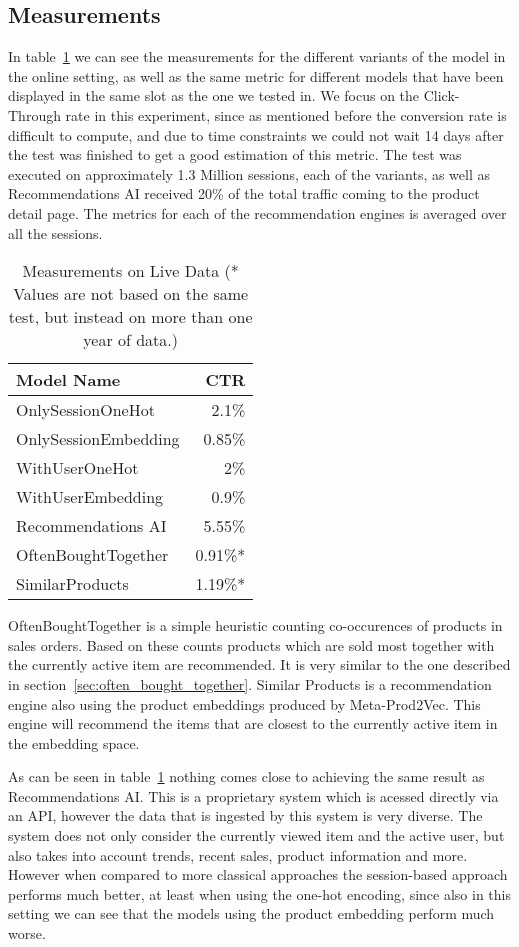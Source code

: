 \subsection{Measurements}
In table~\ref{tab:online_measurements} we can see the measurements for the different variants of the model in the online setting, as well as the same metric for different models that have been displayed in the same slot as the one we tested in.
We focus on the Click-Through rate in this experiment, since as mentioned before the conversion rate is difficult to compute, and due to time constraints we could not wait 14 days after the test was finished to get a good estimation of this metric.
The test was executed on approximately 1.3 Million sessions, each of the variants, as well as Recommendations AI received 20\% of the total traffic coming to the product detail page.
The metrics for each of the recommendation engines is averaged over all the sessions.
\begin{table}[t]
    \centering
    \begin{tabular}{lr}\toprule
        \textbf{Model Name} & \textbf{CTR} \\ \midrule
        OnlySessionOneHot & 2.1\% \\
        OnlySessionEmbedding & 0.85\% \\
        WithUserOneHot & 2\% \\
        WithUserEmbedding & 0.9\% \\
        Recommendations AI & 5.55\% \\
        OftenBoughtTogether & 0.91\%* \\
        SimilarProducts & 1.19\%* \\ \bottomrule
    \end{tabular}
    \caption{Measurements on Live Data (* Values are not based on the same test, but instead on more than one year of data.)}
    \label{tab:online_measurements}
\end{table}
\par
OftenBoughtTogether is a simple heuristic counting co-occurences of products in sales orders.
Based on these counts products which are sold most together with the currently active item are recommended.
It is very similar to the one described in section~\ref{sec:often_bought_together}.
Similar Products is a recommendation engine also using the product embeddings produced by Meta-Prod2Vec.
This engine will recommend the items that are closest to the currently active item in the embedding space.
\par
As can be seen in table~\ref{tab:online_measurements} nothing comes close to achieving the same result as Recommendations AI.
This is a proprietary system which is acessed directly via an API, however the data that is ingested by this system is very diverse.
The system does not only consider the currently viewed item and the active user, but also takes into account trends, recent sales, product information and more.
However when compared to more classical approaches the session-based approach performs much better, at least when using the one-hot encoding, since also in this setting we can see that the models using the product embedding perform much worse.